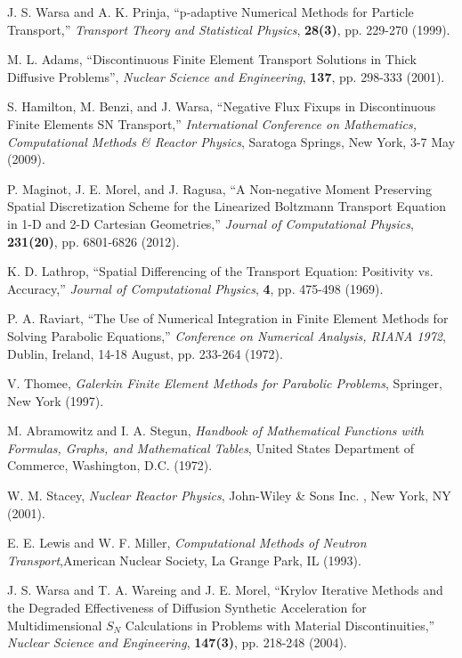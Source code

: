 \documentclass[final,3p,times]{elsarticle}
\begin{document}
\begin{thebibliography}{300}
 J. S. Warsa and A. K. Prinja, ``p-adaptive Numerical Methods for Particle Transport,'' {\it Transport Theory and Statistical Physics}, {\bf 28(3)}, pp. 229-270 (1999).

 M. L. Adams, ``Discontinuous Finite Element Transport Solutions in Thick Diffusive Problems'', {\it Nuclear Science and Engineering}, {\bf 137}, pp. 298-333 (2001).

 S. Hamilton, M. Benzi, and J. Warsa, ``Negative Flux Fixups in Discontinuous Finite Elements SN Transport,'' {\it International Conference on Mathematics, Computational Methods \& Reactor Physics}, Saratoga Springs, New York, 3-7 May (2009). 

 P. Maginot, J. E. Morel, and J. Ragusa, ``A Non-negative Moment Preserving Spatial Discretization Scheme for the Linearized Boltzmann Transport Equation in 1-D and 2-D Cartesian Geometries,'' {\it Journal of Computational Physics}, {\bf 231(20)}, pp. 6801-6826 (2012).

 K. D. Lathrop, ``Spatial Differencing of the Transport Equation: Positivity vs. Accuracy,'' {\it Journal of Computational Physics}, {\bf 4}, pp. 475-498 (1969).

 P. A. Raviart, ``The Use of Numerical Integration in Finite Element Methods for Solving Parabolic Equations,'' {\it Conference on Numerical Analysis, RIANA 1972}, Dublin, Ireland, 14-18 August, pp. 233-264 (1972).

 V. Thomee, {\it Galerkin Finite Element Methods for Parabolic Problems}, Springer, New York (1997). 

 M. Abramowitz and I. A. Stegun, {\it Handbook of Mathematical Functions with Formulas, Graphs, and Mathematical Tables}, United States Department of Commerce, Washington, D.C. (1972).

 W. M. Stacey, {\it Nuclear Reactor Physics}, John-Wiley \& Sons Inc. , New York, NY (2001).

 E. E. Lewis and W. F. Miller, {\it Computational Methods of Neutron Transport},American Nuclear Society,	La Grange Park, IL (1993).

 J. S. Warsa and T. A. Wareing and J. E. Morel, ``Krylov Iterative Methods and the Degraded Effectiveness of Diffusion Synthetic Acceleration for Multidimensional $S_N$ Calculations in Problems with Material Discontinuities,'' {\it Nuclear Science and Engineering}, {\bf 147(3)}, pp. 218-248 (2004).


\end{thebibliography}
\end{document}

